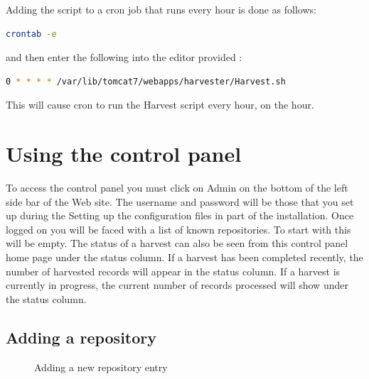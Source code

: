 \documentclass[a4paper,11pt]{article}
\begin{document}
Adding the script to a cron job that runs every hour is done as follows: 

\begin{lstlisting}[language=bash]
 crontab -e
\end{lstlisting}

and then enter the following into the editor provided : 

\begin{lstlisting}[language=bash]
 0 * * * * /var/lib/tomcat7/webapps/harvester/Harvest.sh
\end{lstlisting}

This will cause cron to run the Harvest script every hour, on the hour.

\section{Using the control panel}
\label{sec:using_the_control_panel}

To access the control panel you must click on Admin on the bottom of the left side bar of the Web site. The username and password will be those that you set up during the Setting up the configuration files in  part of the installation. Once logged on you will be faced with a list of known repositories. To start with this will be empty. The status of a harvest can also be seen from this control panel home page under the status column. If a harvest has been completed recently, the number of harvested records will appear in the status column. If a harvest is currently in progress, the current number of records processed will show under the status column.

\subsection{Adding a repository}
\label{sec:using_the_control_panel:adding_a_repository}

\begin{figure}[h]
 \centering
 \caption{Adding a new repository entry}
 \label{adding_repository_information}
\end{figure}
\end{document}
